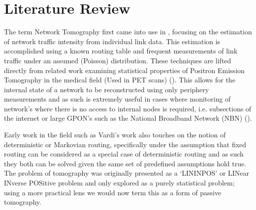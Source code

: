 \chapter{Literature Review}
\label{cha:litreview}

The term Network Tomography first came into use in \cite{vardi_network_1996}, focusing on the estimation of network traffic intensity from individual link data. This estimation is accomplished using a known routing table and frequent measurements of link traffic under an assumed (Poisson) distribution. These techniques are lifted directly from related work examining statistical properties of Positron Emission Tomography in the medical field (Used in PET scans) (\cite{vardi_statistical_1985}). This allows for the internal state of a network to be reconstructed using only periphery measurements and as such is extremely useful in cases where monitoring of network’s where there is no access to internal nodes is required, i.e. subsections of the internet or large GPON’s such as the National Broadband Network (NBN) (\cite{gregory_how_2019}).\par
Early work in the field such as Vardi’s work also touches on the notion of deterministic or Markovian routing, specifically under the assumption that fixed routing can be considered as a special case of deterministic routing and as such they both can be solved given the same set of predefined assumptions hold true. The problem of tomography was originally presented as a ‘LININPOS’ or LINear INverse POSitive problem and only explored as a purely statistical problem; using a more practical lens we would now term this as a form of passive tomography.\par
